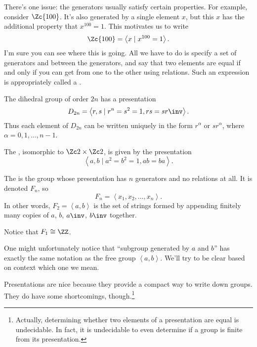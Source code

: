 There's one issue: the generators usually satisfy certain properties.
For example, consider $\Zc{100}$.
It's also generated by a single element $x$,
but this $x$ has the additional property that $x^{100} = 1$.
This motivates us to write
\[ \Zc{100} = \left< x \mid x^{100} = 1 \right>. \]
I'm sure you can see where this is going.
All we have to do is specify a set of generators and
 between the generators,
and say that two elements are equal if and only if
you can get from one to the other using relations.
Such an expression is appropriately called a .

\begin{example}
	The dihedral group of order $2n$ has a presentation
	\[ D_{2n} = \left< r, s
		\mid r^n = s^2 = 1, rs = sr\inv \right>. \]
	Thus each element of $D_{2n}$ can be written uniquely in the form $r^\alpha$
	or $sr^\alpha$, where $\alpha = 0, 1, \dots, n-1$.
\end{example}

\begin{example}
	The ,
	isomorphic to $\Zc2 \times \Zc2$, is given by the presentation
	\[ \left< a,b \mid a^2=b^2=1, ab=ba \right>. \]
\end{example}

\begin{example}
	The  is the group
	whose presentation has $n$ generators and no relations at all.
	It is denoted $F_n$, so
	\[
		F_n = \left< x_1, x_2, \dots, x_n \right>.
	\]
	In other words, $F_2 = \left<a,b\right>$ is the set of strings
	formed by appending finitely many copies of $a$, $b$, $a\inv$, $b\inv$ together.
\end{example}
\begin{ques}
	Notice that $F_1 \cong \ZZ$.
\end{ques}
\begin{abuse}
	One might unfortunately notice that ``subgroup generated by $a$ and $b$''
	has exactly the same notation as the free group $\left<a,b\right>$.
	We'll try to be clear based on context which one we mean.
\end{abuse}

Presentations are nice because they provide a compact way to write down groups.
They do have some shortcomings, though.\footnote{%
Actually, determining whether two elements of a presentation are equal is undecidable.
In fact, it is undecidable to even determine if a group is finite from its presentation.}

